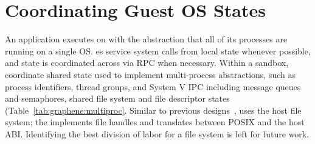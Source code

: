 \section{Coordinating Guest OS States}
\label{sec:graphene:namespaces}



An application executes on \sysname{} 
with the abstraction that all of its processes are running on a single OS.
\sysname{} \libos{}es service system calls
from local \libos{} state whenever possible,
and state is coordinated across \picoprocs{} via RPC when necessary.
Within a sandbox, \sysname{} \picoprocs{} 
coordinate shared state used to implement multi-process
abstractions, such as process identifiers, thread groups, and 
System V IPC including message queues and semaphores, shared file system and file descriptor states (Table~\ref{tab:graphene:multiproc}.
Similar to previous designs~\citep{porter11drawbridge,baumann13bascule}, 
\sysname{} uses the host file system; 
the \libos{} implements file handles and translates between POSIX and the host ABI.
Identifying the best division of labor for a \libos{} file system is 
left for future work.

